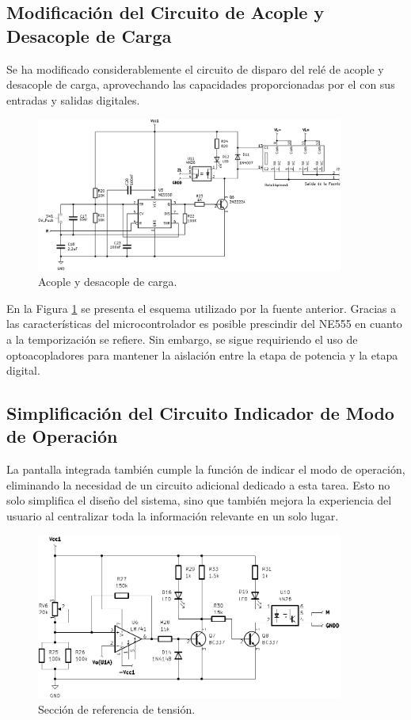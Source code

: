 \subsection{Modificación del Circuito de Acople y Desacople de Carga}\par 
Se ha modificado considerablemente el circuito de disparo del relé de acople y desacople de carga, aprovechando las capacidades proporcionadas por el  con sus entradas y salidas digitales.
\begin{figure}[H]
    \centering
    \includegraphics[width=0.9\textwidth]{./imagenes/conexion_carga.PNG}
    \caption{Acople y desacople de carga.}
    \label{F:conexion_carga}
\end{figure}\par 
En la Figura \ref{F:conexion_carga} se presenta el esquema utilizado por la fuente anterior. Gracias a las características del microcontrolador es posible prescindir del NE555 en cuanto a la temporización se refiere. Sin embargo, se sigue requiriendo el uso de optoacopladores para mantener la aislación entre la etapa de potencia y la etapa digital.

\subsection{Simplificación del Circuito Indicador de Modo de Operación}
La pantalla integrada también cumple la función de indicar el modo de operación, eliminando la necesidad de un circuito adicional dedicado a esta tarea. Esto no solo simplifica el diseño del sistema, sino que también mejora la experiencia del usuario al centralizar toda la información relevante en un solo lugar.
\begin{figure}[H]
    \centering
    \includegraphics[width=0.9\textwidth]{./imagenes/modo_operacion.PNG}
    \caption{Sección de referencia de tensión.}
    \label{F:modo_operacion}
\end{figure}

